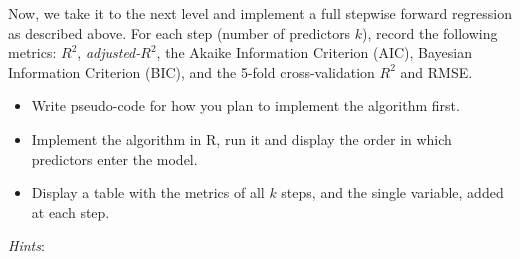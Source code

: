\documentclass[
]{book}
\begin{document}
Now, we take it to the next level and implement a full stepwise forward regression as described above. For each step (number of predictors \(k\)), record the following metrics: \(R^2\), \emph{adjusted-}\(R^2\), the Akaike Information Criterion (AIC), Bayesian Information Criterion (BIC), and the 5-fold cross-validation \(R^2\) and RMSE.

\begin{itemize}
\item
  Write pseudo-code for how you plan to implement the algorithm first.
\item
  Implement the algorithm in R, run it and display the order in which predictors enter the model.
\item
  Display a table with the metrics of all \(k\) steps, and the single variable, added at each step.
\end{itemize}

\emph{Hints}:
\end{document}
